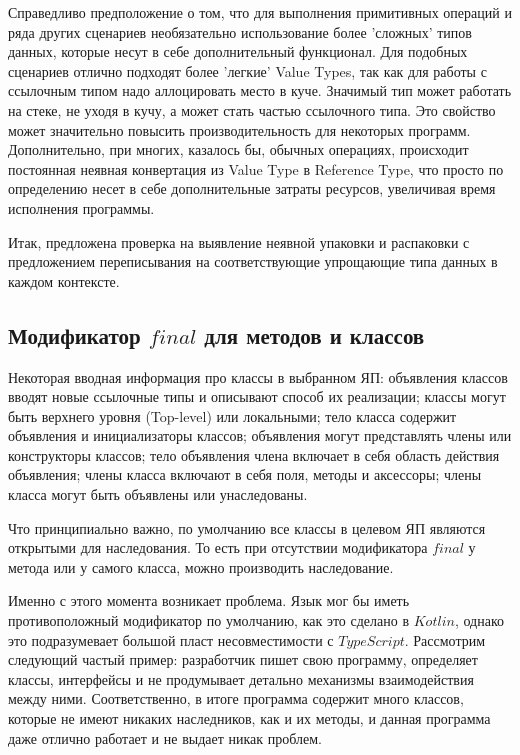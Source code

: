 \documentclass{mipt-thesis-bs}
\begin{document}
Справедливо предположение о том, что для выполнения примитивных операций и ряда других
сценариев необязательно использование более 'сложных' типов данных, которые несут 
в себе дополнительный функционал.
Для подобных сценариев отлично подходят более 'легкие' Value Types, так как для работы 
с ссылочным типом надо аллоцировать место в куче. Значимый тип может работать на 
стеке, не уходя в кучу, а может стать частью ссылочного типа. 
Это свойство может значительно повысить производительность для некоторых программ.
Дополнительно, при многих, казалось бы, обычных операциях, происходит постоянная неявная
конвертация из Value Type в Reference Type, что просто по определению несет в себе 
дополнительные затраты ресурсов, увеличивая время исполнения программы.

Итак, предложена проверка на выявление неявной упаковки и распаковки с предложением
переписывания на соответствующие упрощающие типа данных в каждом контексте.


\subsection{Модификатор $final$ для методов и классов}

Некоторая вводная информация про классы в выбранном ЯП: объявления классов 
вводят новые ссылочные типы и описывают способ их реализации;
классы могут быть верхнего уровня (Top-level) или локальными;
тело класса содержит объявления и инициализаторы классов;
объявления могут представлять члены или конструкторы классов;
тело объявления члена включает в себя область действия объявления;
члены класса включают в себя поля, методы и аксессоры; члены класса могут 
быть объявлены или унаследованы.

Что принципиально важно, по умолчанию все классы в целевом ЯП являются открытыми
для наследования. То есть при отсутствии модификатора $final$ у метода или 
у самого класса, можно производить наследование.

Именно с этого момента возникает проблема. Язык мог бы иметь противоположный
модификатор по умолчанию, как это сделано в $Kotlin$, однако это подразумевает большой пласт несовместимости
с $TypeScript$. Рассмотрим следующий частый пример: разработчик пишет свою программу, 
определяет классы, интерфейсы и не продумывает детально механизмы взаимодействия между ними.
Соответственно, в итоге программа содержит много классов, которые не имеют никаких 
наследников, как и их методы, и данная программа даже отлично работает и не выдает
никак проблем.
\end{document}

